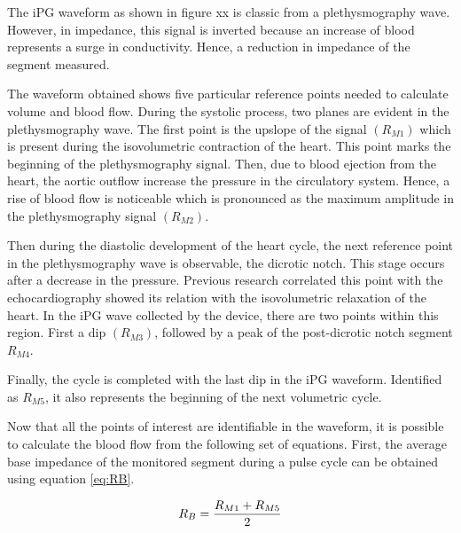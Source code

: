 
The iPG waveform as shown in figure xx is classic from a plethysmography wave. However, in impedance, this signal is inverted because an increase of blood represents a surge in conductivity. Hence, a reduction in impedance of the segment measured.  


The waveform obtained shows five particular reference points needed to calculate volume and blood flow. During the systolic process, two planes are evident in the plethysmography wave. The first point is the upslope of the signal $(R_{M1})$ which is present during the isovolumetric contraction of the heart.  This point marks the beginning of the plethysmography signal. Then, due to blood ejection from the heart, the aortic outflow increase the pressure in the circulatory system. Hence, a rise of blood flow is noticeable which is pronounced as the maximum amplitude in the plethysmography signal $(R_{M2})$. 

Then during the diastolic development of the heart cycle, the next reference point in the plethysmography wave is observable, the dicrotic notch. This stage occurs after a decrease in the pressure. Previous research correlated this point with the echocardiography showed its relation with the isovolumetric relaxation of the heart. In the iPG wave collected by the device, there are two points within this region. First a dip $(R_{M3})$, followed by a peak of the post-dicrotic notch segment $R_{M4}$. 


Finally, the cycle is completed with the last dip in the iPG waveform. Identified as $R_{M5}$, it also represents the beginning of the next volumetric cycle. 

Now that all the points of interest are identifiable in the waveform, it is possible to calculate the blood flow from the following set of equations. First, the average base impedance of the monitored segment during a pulse cycle can be obtained using equation \ref{eq:RB}.

\begin{align}
	\label{eq:RB}
	R_B = \frac{R_{M1}+R_{M5}}{2} \tagaddtext{[\si{\Omega}]}
\end{align}

